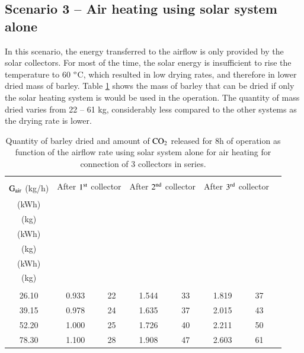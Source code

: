 \subsection{Scenario 3 -- Air heating using solar system alone}

In this scenario, the energy transferred to the airflow is only provided by the solar collectors. For most of the time, the solar energy is insufficient to rise the temperature to 60 $^{\rm{o}}$C, which resulted in low drying rates, and therefore in lower dried mass of barley. Table \ref{solar-only} shows the mass of barley that can be dried if only the solar heating system is would be used in the operation. The quantity of mass dried varies from 22 -- 61 kg, considerably less compared to the other systems as the drying rate is lower. 

\begin{table}[h]
	\caption{Quantity of barley dried and amount of $\rm{CO_2}$ released for 8h of operation as function of the airflow rate using solar system alone for air heating for connection of 3 collectors in series.}
	\centering
	
	\begin{tabular}{cccccccc}
		\hline \\ [-10pt]
		\multirow{2}{*}{ $\rm{G_{air}}$  (kg/h)} & \multicolumn{2}{c}{After $\rm{1^{st}}$ collector} & \multicolumn{2}{c}{After $\rm{2^{nd}}$ collector} & \multicolumn{2}{c}{After $\rm{3^{rd}}$ collector} \\
		
		 & \makecell{$\rm{Q_{u}}$ \\ (kWh)} & 	\makecell{$\rm{M_{bar,dried}}$ \\ (kg)} & 	\makecell{$\rm{Q_{u}}$  \\ (kWh)} & \makecell{$\rm{M_{bar,dried}}$ \\ (kg)} & \makecell{$\rm{Q_{u}}$  \\ (kWh)} & \makecell{$\rm{M_{bar,dried}}$ \\ (kg)} \\
		\hline \\ [-10pt]
		26.10 & 0.933 & 22 & 1.544 & 33 & 1.819 & 37 \\ [2pt]
		39.15 & 0.978 & 24 & 1.635 & 37 & 2.015 & 43 \\ [2pt]
		52.20 & 1.000 & 25 & 1.726 & 40 & 2.211 & 50 \\ [2pt]
		78.30 & 1.100 & 28 & 1.908 & 47 & 2.603 & 61 \\ 
		\hline
	\end{tabular}
	
	\label{solar-only}
\end{table}

